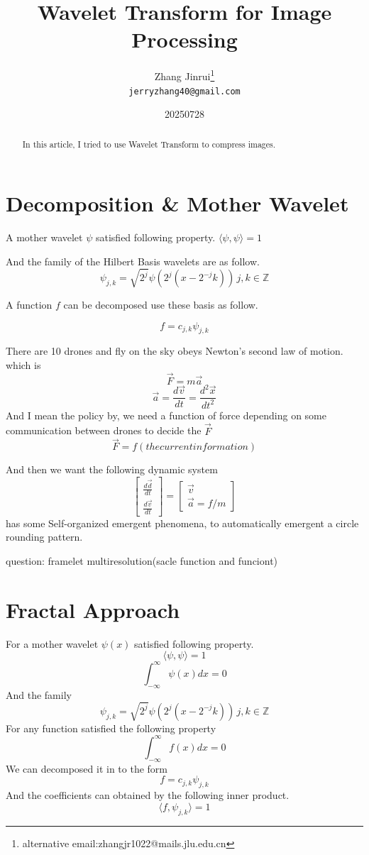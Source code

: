\documentclass{article}
\title{Wavelet Transform for Image Processing}
\author{
Zhang Jinrui\thanks{alternative email:zhangjr1022@mails.jlu.edu.cn} \\ \texttt{jerryzhang40@gmail.com}
}
\date{20250728}  %
\theoremstyle{definition} %
\begin{document}
\maketitle

\begin{abstract}
    In this article, I tried to use
    Wavelet Transform to compress
    images.
\end{abstract}


\section{Decomposition \& Mother Wavelet}
A mother wavelet \(\psi\) satisfied
following property.
\(\langle\psi,\psi\rangle=1\)

And the family of the Hilbert Basis
wavelets are as follow.
\[
    \psi_{j,k}=\sqrt{2^j}\psi(2^j(x-2^{-j}k)) \, j,k\in \mathbb{Z}
\]

A function \(f\) can be decomposed
use these basis as follow.

\[
    f=c_{j,k}\psi_{j,k}
\]

There are 10 drones and fly on the sky
obeys Newton's second law of motion.
which is
\[
    \vec{F} = m \vec{a}
\]
\[
    \vec{a} = \frac{d\vec{v}}{dt} = \frac{d^2 \vec{x}}{dt^2}
\]
And I mean the policy by, we need a function of force
depending on some communication between drones
to decide the \(\vec{F}\)
\[
    \vec{F}=f(the current information)
\]

And then we want the following dynamic system
\[\begin{bmatrix}
        \frac{d\vec{d}}{dt} \\
        \frac{d\vec{v}}{dt}
    \end{bmatrix}=
    \begin{bmatrix}
        \vec{v} \\
        \vec{a}=f/m
    \end{bmatrix}
\]
has some Self-organized emergent phenomena,
to automatically emergent a circle rounding pattern.

question: framelet multiresolution(sacle function and funciont)

\section{Fractal Approach}
For a mother wavelet \(\psi(x)\) satisfied
following property.
\[
    \langle\psi,\psi\rangle=1
\]
\[
    \int_{-\infty}^{\infty}\psi(x)dx=0
\]
And the family
\[
    \psi_{j,k}=\sqrt{2^j}\psi(2^j(x-2^{-j}k)) \, j,k\in \mathbb{Z}
\]
For any function satisfied
the following property
\[
    \int_{-\infty}^{\infty}f(x)dx=0
\]
We can decomposed it in to the form
\[
    f=c_{j,k}\psi_{j,k}
\]
And the coefficients can obtained by
the following inner product.
\[
    \langle f,\psi_{j,k}\rangle=1
\]
\end{document}
